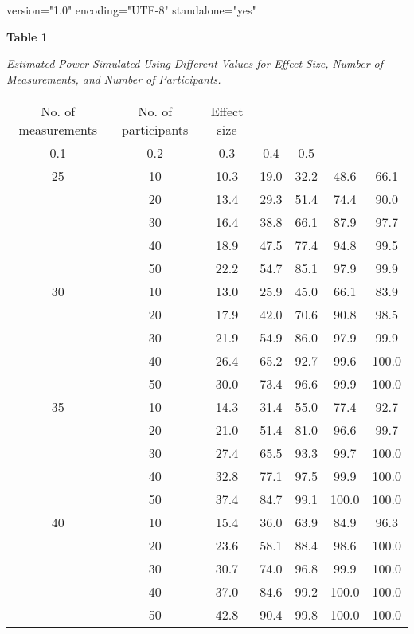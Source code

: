 version="1.0" encoding="UTF-8" standalone="yes" \documentclass{article}
\begin{document}
\textbf{Table 1}

\emph{Estimated }\emph{P}\emph{ower }\emph{S}\emph{imulated }\emph{U}\emph{sing }\emph{D}\emph{ifferent }\emph{V}\emph{alues for }\emph{E}\emph{ffect }\emph{S}\emph{ize, }\emph{N}\emph{umber of }\emph{M}\emph{easurements, and }\emph{N}\emph{umber of }\emph{P}\emph{articipants.}


  \begin{table}

  
  \begin{tabular}{c  c  c  c  c  c  c}

  No. of measurements & No. of participants & Effect size\\
0.1 & 0.2 & 0.3 & 0.4 & 0.5\\
25 & 10 & 10.3 & 19.0 & 32.2 & 48.6 & 66.1\\
  & 20 & 13.4 & 29.3 & 51.4 & 74.4 & 90.0\\
  & 30 & 16.4 & 38.8 & 66.1 & 87.9 & 97.7\\
  & 40 & 18.9 & 47.5 & 77.4 & 94.8 & 99.5\\
  & 50 & 22.2 & 54.7 & 85.1 & 97.9 & 99.9\\
30 & 10 & 13.0 & 25.9 & 45.0 & 66.1 & 83.9\\
  & 20 & 17.9 & 42.0 & 70.6 & 90.8 & 98.5\\
  & 30 & 21.9 & 54.9 & 86.0 & 97.9 & 99.9\\
  & 40 & 26.4 & 65.2 & 92.7 & 99.6 & 100.0\\
  & 50 & 30.0 & 73.4 & 96.6 & 99.9 & 100.0\\
35 & 10 & 14.3 & 31.4 & 55.0 & 77.4 & 92.7\\
  & 20 & 21.0 & 51.4 & 81.0 & 96.6 & 99.7\\
  & 30 & 27.4 & 65.5 & 93.3 & 99.7 & 100.0\\
  & 40 & 32.8 & 77.1 & 97.5 & 99.9 & 100.0\\
  & 50 & 37.4 & 84.7 & 99.1 & 100.0 & 100.0\\
40 & 10 & 15.4 & 36.0 & 63.9 & 84.9 & 96.3\\
  & 20 & 23.6 & 58.1 & 88.4 & 98.6 & 100.0\\
  & 30 & 30.7 & 74.0 & 96.8 & 99.9 & 100.0\\
  & 40 & 37.0 & 84.6 & 99.2 & 100.0 & 100.0\\
  & 50 & 42.8 & 90.4 & 99.8 & 100.0 & 100.0\\


\end{tabular}


\end{table}
\end{document}

